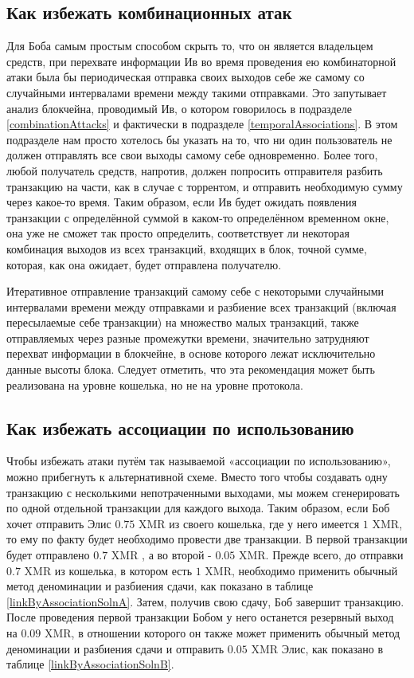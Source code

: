 \documentclass{mrl}
\begin{document}
\subsection{Как избежать комбинационных атак}\label{mitigCombo}

Для Боба самым простым способом скрыть то, что он является владельцем средств, при перехвате информации Ив во время проведения ею комбинаторной атаки была бы периодическая отправка своих выходов себе же самому со случайными интервалами времени между такими отправками. Это запутывает анализ блокчейна, проводимый Ив, о котором говорилось в подразделе \ref{combinationAttacks} и фактически в подразделе \ref{temporalAssociations}. В этом подразделе нам просто хотелось бы указать на то, что ни один пользователь не должен отправлять все свои выходы самому себе одновременно. Более того, любой получатель средств, напротив, должен попросить отправителя разбить транзакцию на части, как в случае с торрентом, и отправить необходимую сумму через какое-то время. Таким образом, если Ив будет ожидать появления транзакции с определённой суммой в каком-то определённом временном окне, она уже не сможет так просто определить, соответствует ли некоторая комбинация выходов из всех транзакций, входящих в блок, точной сумме, которая, как она ожидает, будет отправлена получателю.

Итеративное отправление транзакций самому себе с некоторыми случайными интервалами времени между отправками и разбиение всех транзакций (включая пересылаемые себе транзакции) на множество малых транзакций, также отправляемых через разные промежутки времени, значительно затрудняют перехват информации в блокчейне, в основе которого лежат исключительно данные высоты блока. Следует отметить, что эта рекомендация может быть реализована на уровне кошелька, но не на уровне протокола.

\subsection{Как избежать ассоциации по использованию}\label{mitigAssoc}

Чтобы избежать атаки путём так называемой «ассоциации по использованию», можно прибегнуть к альтернативной схеме. Вместо того чтобы создавать одну транзакцию с несколькими непотраченными выходами, мы можем сгенерировать по одной отдельной транзакции для каждого выхода. Таким образом, если Боб хочет отправить Элис $0.75$ XMR из своего кошелька, где у него имеется $1$ XMR, то ему по факту будет необходимо провести две транзакции. В первой транзакции будет отправлено $0.7$ XMR , а во второй - $0.05$ XMR.  Прежде всего, до отправки $0.7$ XMR из кошелька, в котором есть $1$ XMR, необходимо применить обычный метод деноминации и разбиения сдачи, как показано в таблице \ref{linkByAssociationSolnA}. Затем, получив свою сдачу, Боб завершит транзакцию. После проведения первой транзакции Бобом у него останется резервный выход на $0.09$ XMR, в отношении которого он также может применить обычный метод деноминации и разбиения сдачи и отправить $0.05$ XMR Элис, как показано в таблице \ref{linkByAssociationSolnB}.
\end{document}
